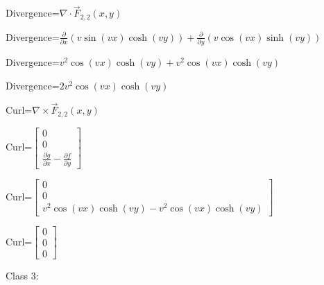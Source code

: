 \documentclass[12pt, executivepaper]{article}
\begin{document}
\begin{flushleft}
\vspace{3mm}

Divergence=$\nabla \cdot \vec F_{2,2}(x,y)$ \\

\vspace{3mm}

Divergence=$\frac{\partial}{\partial x}(v\sin(vx)\cosh(vy))+\frac{\partial}{\partial y}(v\cos(vx)\sinh(vy))$ \\

\vspace{3mm}

Divergence=$v^2\cos(vx)\cosh(vy)+v^2\cos(vx)\cosh(vy)$ \\

\vspace{3mm}

Divergence=$2v^2\cos(vx)\cosh(vy)$ \\

\vspace{3mm}

Curl=$\nabla \times \vec F_{2,2}(x,y)$ \\

\vspace{3mm}

Curl=$\begin{bmatrix}
0 \\
0 \\
\frac{\partial g}{\partial x}-\frac{\partial f}{\partial y}
\end{bmatrix}$ \\

\vspace{3mm}

Curl=$\begin{bmatrix}
0 \\
0 \\
v^2\cos(vx)\cosh(vy)-v^2\cos(vx)\cosh(vy)
\end{bmatrix}$ \\

\vspace{3mm}

Curl=$\begin{bmatrix}
0 \\
0 \\
0
\end{bmatrix}$ \\

\vspace{5mm}

Class 3: \\


\end{flushleft}
\end{document}

